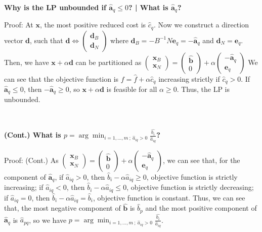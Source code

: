 \documentclass[9pt]{article}
\begin{document}
~

\textbf{Why is the LP unbounded if $\widehat{\mathbf{a}}_q\leq0$? | What is $\widehat{\mathbf{a}}_q$?}

Proof: At $\mathbf{x}$, the most positive reduced cost is $\widehat{c}_q$. Now we construct a direction vector $\mathbf{d}$, such that $\mathbf{d}\Leftrightarrow\begin{pmatrix}\mathbf{d}_B \\ \mathbf{d}_N\end{pmatrix}$ where $\mathbf{d}_B=-B^{-1}N\mathbf{e}_q=-\widehat{\mathbf{a}}_q$ and $\mathbf{d}_N=\mathbf{e}_q$.
Then, we have $\mathbf{x}+\alpha\mathbf{d}$ can be partitioned as $\begin{pmatrix}\mathbf{x}_B \\ \mathbf{x}_N\end{pmatrix}=\begin{pmatrix}\widehat{\mathbf{b}} \\ 0\end{pmatrix}+\alpha\begin{pmatrix}-\widehat{\mathbf{a}}_q \\ \mathbf{e}_q\end{pmatrix}$
We can see that the objective function is $f=\widehat{f}+\alpha\widehat{c}_q$ increasing strictly if $\widehat{c}_q>0$. \qquad \qquad If $\widehat{\mathbf{a}}_q\le0$, then $-\widehat{\mathbf{a}}_q\ge0$, so $\mathbf{x}+\alpha\mathbf{d}$ is feasible for all $\alpha\ge0$. Thus, the LP is unbounded.

~

\textbf{(Cont.) What is $p=\arg\min_{i=1,...,m \ ; \ \widehat{a}_{iq}>0}\frac{\widehat{b_i}}{\widehat{a}_{iq}}$?}

Proof: (Cont.) As $\begin{pmatrix}\mathbf{x}_B \\ \mathbf{x}_N\end{pmatrix}=\begin{pmatrix}\widehat{\mathbf{b}} \\ 0\end{pmatrix}+\alpha\begin{pmatrix}-\widehat{\mathbf{a}}_q \\ \mathbf{e}_q\end{pmatrix}$, we can see that, for the component of $\widehat{\mathbf{a}}_q$, if $\widehat{a}_{iq}>0$, then $\widehat{b}_i-\alpha\widehat{a}_{iq}\ge0$, objective function is strictly increasing; if $\widehat{a}_{iq}<0$, then $\widehat{b}_i-\alpha\widehat{a}_{iq}\le0$, objective function is strictly decreasing; if $\widehat{a}_{iq}=0$, then $\widehat{b}_i-\alpha\widehat{a}_{iq}=\widehat{b}_i$, objective function is constant. 
Thus, we can see that, the most negative component of $\widehat{\mathbf{b}}$ is $\widehat{b}_p$ and the most positive component of $\widehat{\mathbf{a}}_q$ is $\widehat{a}_{pq}$, so we have $p=\arg\min_{i=1,...,m \ ; \ \widehat{a}_{iq}>0}\frac{\widehat{b_i}}{\widehat{a}_{iq}}$.
\end{document}
